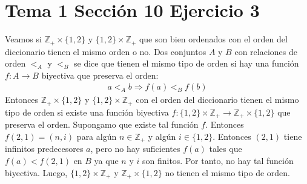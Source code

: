 \documentclass{article}
\begin{document}
\section{Tema 1 Sección 10 Ejercicio 3}
Veamos si $\mathbb{Z}_{+}\times \{1,2\}$ y $\{1,2\}\times\mathbb{Z}_{+}$ que son bien ordenados con el orden del diccionario tienen el mismo orden o no. Dos conjuntos $A$ y $B$ con relaciones de orden $<_A$ y $<_B$ se dice que tienen el mismo tipo de orden si hay una función $f:A\rightarrow B$ biyectiva que preserva el orden:
\begin{eqnarray}
a<_A b\Rightarrow f(a)<_B f(b)\nonumber
\end{eqnarray}
Entonces $\mathbb{Z}_{+}\times \{1,2\}$ y $\{1,2\}\times\mathbb{Z}_{+}$ con el orden del diccionario tienen el mismo tipo de orden si existe una función biyectiva $f:\{1,2\}\times\mathbb{Z}_{+}\rightarrow\mathbb{Z}_{+}\times \{1,2\}$ que preserva el orden. Supongamo que existe tal función $f$. Entonces $f(2,1)=(n,i)$ para algún $n\in\mathbb{Z}_{+}$ y algún $i\in\{1,2\}$. Entonces $(2,1)$ tiene infinitos predecesores $a$, pero no hay suficientes $f(a)$ tales que $f(a)<f(2,1)$ en $B$ ya que $n$ y $i$ son finitos. Por tanto, no hay tal función biyectiva. Luego, $\{1,2\}\times\mathbb{Z}_{+}$ y $\mathbb{Z}_{+}\times \{1,2\}$ no tienen el mismo tipo de orden.
\end{document}

